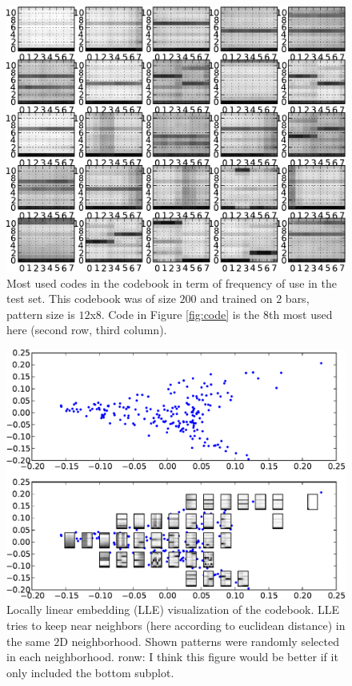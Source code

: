 \documentclass{article}
\begin{document}
\begin{figure}[htb]
\begin{center}
\includegraphics[width=.9\columnwidth]{codes1}
\end{center}
\caption{\small{
Most used codes in the codebook in term of frequency of use in the test
set. This codebook was of size $200$ and trained on $2$ bars, pattern
size is $12$x$8$. Code in Figure \ref{fig:code} is the $8$th most used
here (second row, third column).
}}
\label{fig:codes1}
\end{figure}

\begin{figure}[htb]
\begin{center}
\includegraphics[width=.9\columnwidth]{codes_lle}
\end{center}
\caption{\small{
Locally linear embedding (LLE) visualization of the codebook.
LLE tries to keep near neighbors (here according to euclidean distance)
in the same $2$D neighborhood. Shown patterns were randomly selected
in each neighborhood.
}
ronw: I think this figure would be better if it only included the
bottom subplot.
}
\label{fig:lle}
\end{figure}
\end{document}
